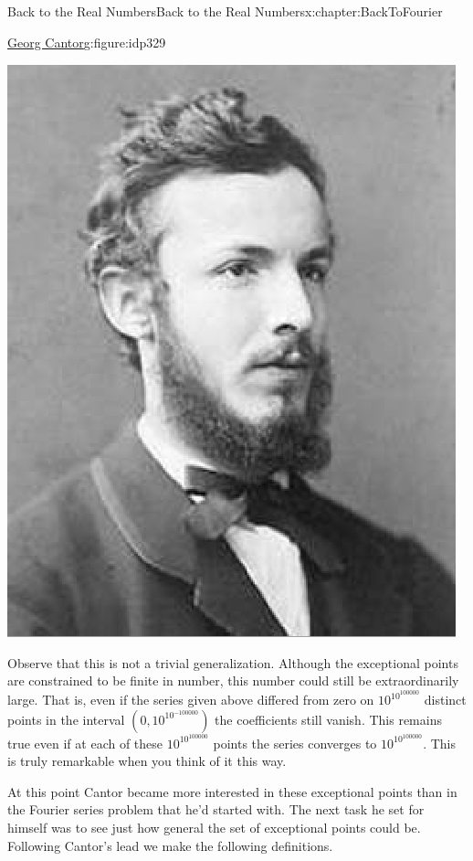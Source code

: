 \begin{chapterptx}{Back to the Real Numbers}{}{Back to the Real Numbers}{}{}{x:chapter:BackToFourier}
\begin{introduction}{}
\begin{figureptx}{\href{https://mathshistory.st-andrews.ac.uk/Biographies/Cantor/}{Georg Cantor}\protect\footnotemark{}}{g:figure:idp329}{}
\begin{image}{0.325}{0.35}{0.325}
				\includegraphics[width=\linewidth]{external/images/Cantor.png}
			\end{image}%
			\tcblower
		\end{figureptx}%
		Observe that this is not a trivial generalization. Although the exceptional points are constrained to be finite in number, this number could still be extraordinarily large. That is, even if the series given above differed from zero on \(10^{10^{100000}}\) distinct points in the interval \((0, 10^{10^{-100000}})\) the coefficients still vanish. This remains true even if at each of these \(10^{10^{100000}}\) points the series converges to \(10^{10^{100000}}\). This is truly remarkable when you think of it this way.%
		\par
		At this point Cantor became more interested in these exceptional points than in the Fourier series problem that he'd started with. The next task he set for himself was to see just how general the set of exceptional points could be. Following Cantor's lead we make the following definitions.%

\end{introduction}
\end{chapterptx}

